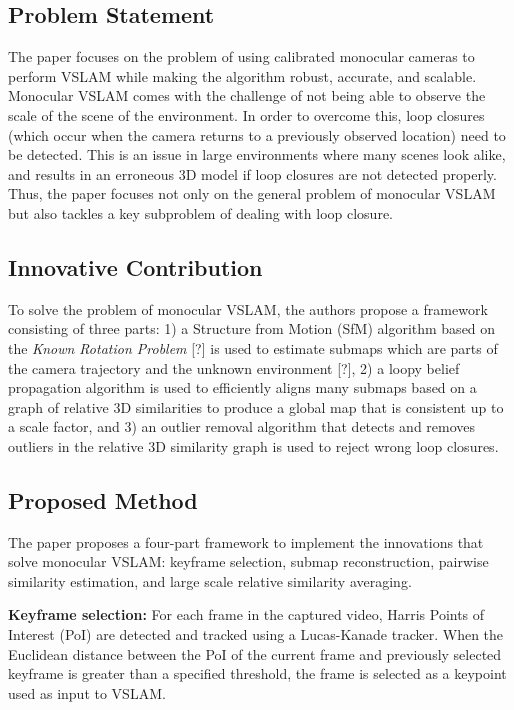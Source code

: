 \documentclass[10pt,twocolumn,letterpaper]{article}
\begin{document}
\subsection{Problem Statement}

The paper focuses on the problem of using calibrated monocular cameras to perform VSLAM while making the 
algorithm robust, accurate, and scalable.  Monocular VSLAM comes with the challenge of not being able to 
observe the scale of the scene of the environment.  In order to overcome this, loop closures 
(which occur when the camera returns to a previously observed location) need to be detected.  
This is an issue in large environments where many scenes look alike, and results in an erroneous 
3D model if loop closures are not detected properly.  Thus, the paper focuses not only on the general 
problem of monocular VSLAM but also tackles 
a key subproblem of dealing with loop closure.

\subsection{Innovative Contribution}

To solve the problem of monocular VSLAM, the authors propose a framework consisting of three parts:
1) a Structure from Motion (SfM) algorithm based on the \textit{Known Rotation Problem} [?]  
is used to estimate submaps which are parts of the camera trajectory and the unknown environment [?],
2) a loopy belief propagation algorithm is used to efficiently aligns many submaps based 
on a graph of relative 3D similarities to produce a global map that is consistent up to a scale factor, and
3) an outlier removal algorithm that detects and removes outliers in the relative 3D similarity 
graph is used to reject wrong loop closures.

\subsection{Proposed Method}
The paper proposes a four-part framework to implement the innovations that solve monocular VSLAM: 
keyframe selection, submap reconstruction, pairwise similarity estimation, and large scale 
relative similarity averaging.

\textbf{Keyframe selection:} For each frame in the captured video, Harris Points of Interest 
(PoI) are detected and tracked using a Lucas-Kanade tracker.  When the Euclidean distance between 
the PoI of the current frame and previously selected keyframe is greater than a specified threshold, the 
frame is selected as a keypoint used as input to VSLAM.
\end{document}
